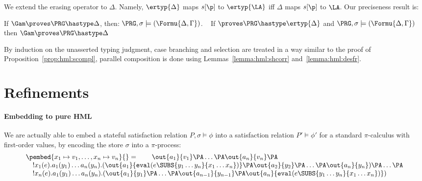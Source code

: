 We extend the erasing operator to $\Delta$. Namely, $\ertyp{\Delta}$ maps $s[\p]$ to $\ertyp{\LA}$ iff $\Delta$ maps $s[\p]$ to $\LA$.
Our preciseness result is:

\begin{PRO}[Preciseness]
\label{prop:hml:cssound}
If $ \Gam \proves \PRG \hastype \Delta $, then: $\PRG ,\sigma \models
(\Formu{\Delta,\Gamma})$.  ~\label{prop:hml:cscomp} If $\proves \PRG
\hastype \ertyp{\Delta} $ and $\PRG ,\sigma \models
(\Formu{\Delta,\Gamma})$ then $ \Gam \proves \PRG \hastype \Delta $
\end{PRO}

By induction on the unasserted typing judgment, case branching and
selection are treated in a way similar to the proof of
Proposition~\ref{prop:hml:scompl}, parallel composition is done using
Lemmas~\ref{lemma:hml:shcorr} and~\ref{lemma:hml:desfr}.































\section{Refinements} 

\paragraph{Embedding to pure HML} We are actually able to embed a stateful
satisfaction relation $P,\sigma \models \phi$ into a satisfaction
relation $P' \models \phi'$ for a standard $\pi$-calculus with
first-order values, by encoding the store $\sigma$ into a
$\pi$-process:
$$
 \begin{array}{l}\pembed{x_1 \mapsto v_1, \dots, x_n \mapsto v_n}{}
  = \quad\quad \out{a_1}{v_1} \PA \dots \PA \out{a_n}{v_n} \PA
  \\ \quad !x_1(e).a_1(y_1)\dots
  a_n(y_n).(\out{a_1}{\mathtt{eval}(e\SUBS{y_1 \dots y_n}{x_1 \dots
      x_n})} \PA \out{a_2}{y_2} \PA \dots \PA \out{a_n}{y_n} ) \PA
  \dots \PA \\ \quad !x_n(e).a_1(y_1)\dots a_n(y_n).(\out{a_1}{y_1} \PA
  \dots \PA \out{a_{n-1}}{y_{n-1}} \PA
  \out{a_n}{\mathtt{eval}(e\SUBS{y_1 \dots y_n}{x_1 \dots x_n})})
\end{array}$$




